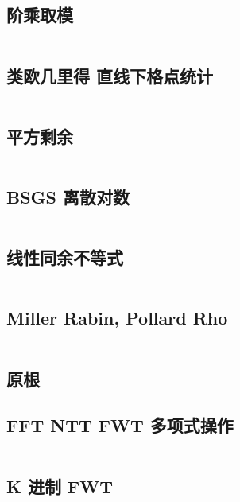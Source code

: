\documentclass[titlepage, a4paper]{article}
\newcommand\nothing{}
\renewcommand{\checkmark}[0]{\nothing}
\begin{document}
\begin{multicols}{2}
\begin{spacing}{0.6}
				\subsection{阶乘取模}
				\inputminted{cpp}{src/Math/Factorial Mod.cpp}
				\subsection{类欧几里得 直线下格点统计\checkmark}
				\inputminted{cpp}{src/Math/直线下格点统计.cpp}
				\subsection{平方剩余}
				\inputminted{cpp}{src/Math/平方剩余.cpp}
				\subsection{BSGS 离散对数}
				\inputminted{cpp}{src/Math/BSGS.cpp}
				\subsection{线性同余不等式}
				\inputminted{cpp}{src/Math/线性同余不等式.cpp}
				\subsection{Miller Rabin, Pollard Rho}
				\inputminted{cpp}{src/Math/Miller Rabin And Pollard Rho.cpp}
				\subsection{原根}
				
				\subsection{FFT NTT FWT 多项式操作}
				\inputminted{cpp}{src/Math/FFT NTT FWT.cpp}
				\subsection{K 进制 FWT}
				\inputminted{cpp}{src/tbr/fwt.cpp}
				
				\inputminted{cpp}{src/Math/Polynomial.cpp}
				

\end{spacing}
\end{multicols}
\end{document}
